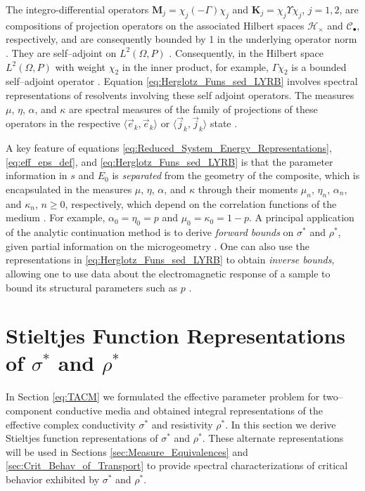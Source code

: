 \documentclass[english,12pt,jmp,graphicx]{revtex4-1}
\begin{document}
The integro-differential operators $\mathbf{M}_j=\chi_j(-\Gamma)\chi_j$ and
$\mathbf{K}_j=\chi_j\Upsilon\chi_j$, $j=1,2$, are compositions of projection
operators on the associated Hilbert spaces $\mathscr{H}_\times$ and
$\mathscr{C}_\bullet$, respectively, and are consequently bounded by 1 in the underlying
operator norm \cite{Rudin:87,Folland:95}. They are self--adjoint on
$L^2(\Omega,P)$ \cite{Golden:CMP-473}. Consequently, in the Hilbert space $L^2(\Omega,P)$
with weight $\chi_2$ in the inner product, for example, $\Gamma\chi_2$ is a 
bounded self--adjoint operator \cite{Golden:CMP-473}. Equation
\eqref{eq:Herglotz_Funs_sed_LYRB} involves spectral representations of
resolvents involving these self adjoint operators. The measures $\mu$,
$\eta$, $\alpha$, and $\kappa$ are spectral measures of the family of projections
of these operators in the respective $\langle\vec{e}_k,\vec{e}_k\rangle$ or
$\langle\vec{j}_k,\vec{j}_k\rangle$ state \cite{Golden:CMP-473,Reed-1980}.   

A key feature of equations
\eqref{eq:Reduced_System_Energy_Representations}, \eqref{eq:eff_eps_def}, and
\eqref{eq:Herglotz_Funs_sed_LYRB} is 
that the parameter information in $s$ and $E_0$ is {\it separated}
from the geometry of the composite, which is encapsulated in the 
measures $\mu$, $\eta$, $\alpha$, and $\kappa$ through their moments $\mu_n$, $\eta_n$,
$\alpha_n$, and $\kappa_n$, $n\geq0$, respectively, which depend on the correlation functions of the
medium \cite{Golden:CMP-473}. For example, $\alpha_0=\eta_0=p$ and
$\mu_0=\kappa_0=1-p$. A principal application of the analytic continuation
method is to derive \emph{forward bounds} on $\sigma^*$ and $\rho^*$, given partial
information on the microgeometry
\cite{Bergman:PRL-1285,Milton:APL-300,Golden:CMP-473,Bergman:AP-78}. One
can also use the
representations in
\eqref{eq:Herglotz_Funs_sed_LYRB} to obtain \emph{inverse bounds},
allowing one to use data about the electromagnetic response of a
sample to bound its structural parameters such as $p$ \cite{Golden:JoB:337}.
%
\section{Stieltjes Function Representations of $\sigma^*$ and $\rho^*$}
\label{sec:SF_Reps}
%
In Section \ref{eq:TACM} we formulated the effective parameter problem
for two--component conductive media and obtained integral
representations of the effective complex conductivity $\sigma^*$ and
resistivity $\rho^*$. In this section we derive Stieltjes function
representations of $\sigma^*$ and $\rho^*$. These alternate
representations will be used in Sections
\ref{sec:Measure_Equivalences} and \ref{sec:Crit_Behav_of_Transport}
to provide spectral characterizations of critical behavior
exhibited by $\sigma^*$ and $\rho^*$.   
\end{document}
